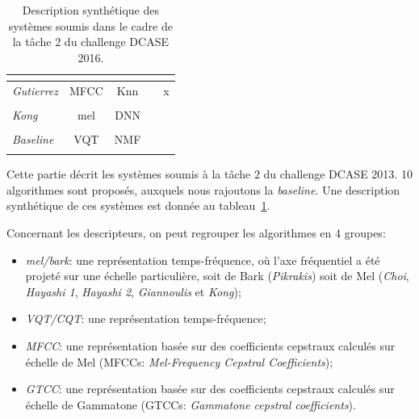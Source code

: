 \begin{table}[t]
\begin{center}
\begin{tabular}{lcccc}
\citep{Vu2016}               &                              &                      &           & \\ 
\hline
\emph{Gutierrez}             &     MFCC                     & Knn                  &           & x \\ 
\citep{GutierrezArriola2016} &                              &                      &           & \\ 
\hline
\emph{Kong}                  &     mel                      & DNN                  &           &  \\ 
\citep{Kong2016}             &                              &                      &           & \\ 
\hline  
\emph{Baseline}              &     VQT                      & NMF                  &           & \\ 
\citep{Benetos2016}          &                              &                      &           & \\ 
\hline 
\end{tabular}
\end{center}
\caption{Description synthétique des systèmes soumis dans le cadre de la tâche 2 du challenge DCASE 2016.}
\label{tab:systemsDcase2016}
\end{table}

Cette partie décrit les systèmes soumis à la tâche 2 du challenge DCASE 2013. 10 algorithmes sont proposés, auxquels nous rajoutons la \emph{baseline}. Une description synthétique de ces systèmes est donnée au tableau~\ref{tab:systemsDcase2016}. 

Concernant les descripteurs, on peut regrouper les algorithmes en 4 groupes:

\begin{itemize}
\item \emph{mel/bark}: une représentation temps-fréquence, où l'axe fréquentiel a été projeté sur une échelle particulière, soit de Bark (\emph{Pikrakis}) soit de Mel (\emph{Choi}, \emph{Hayashi 1}, \emph{Hayashi 2}, \emph{Giannoulis} et \emph{Kong});
\item \emph{VQT/CQT}: une représentation temps-fréquence; 
\item \emph{MFCC}: une représentation basée sur des coefficients cepstraux calculés sur échelle de Mel (MFCCs: \emph{Mel-Frequency Cepstral Coefficients});
\item \emph{GTCC}: une représentation basée sur des coefficients cepstraux calculés sur échelle de Gammatone (GTCCs: \emph{Gammatone cepstral coefficients}).
\end{itemize}

